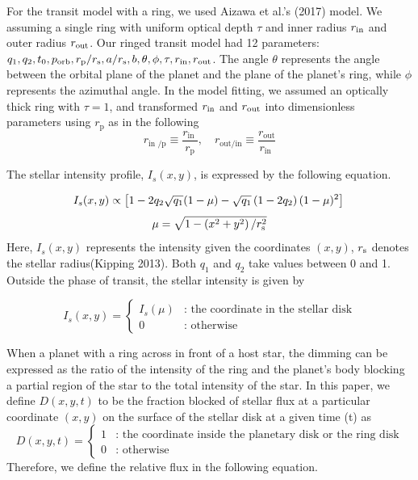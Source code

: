 \documentclass[fleqn,usenatbib, onecolumn,dvipdfmx]{mnras}
\begin{document}
For the transit model with a ring, we used Aizawa et al.'s (2017) model. We assuming a single ring with uniform optical depth $\tau$ and inner radius $r_{\rm{in}}$ and outer radius $r_{\rm{out}}$. Our ringed transit model had 12 parameters: $q_1, q_2, t_0, p_{\rm{orb}}, r_{\rm{p}}/r_{\rm{s}}, a/r_{\rm{s}}, b, \theta, \phi, \tau, r_{\rm{in}}, r_{\rm{out}}$. The angle $\theta$ represents the angle between the orbital plane of the planet and the plane of the planet's ring, while $\phi$ represents the azimuthal angle. In the model fitting, we assumed an optically thick ring with $\tau=1$, and transformed $r_{\rm{in}}$ and $r_{\rm{out}}$ into dimensionless parameters using $r_{\mathrm{p}}$ as in the following 
\begin{equation}
r_{\text {in } / \mathrm{p}} \equiv \frac{r_{\text {in }}}{r_{\mathrm{p}}}, \quad r_{\mathrm{out} / \mathrm{in}} \equiv \frac{r_{\mathrm{out}}}{r_{\text {in }}}
\end{equation}

The stellar intensity profile, $I_s(x, y)$, is expressed by the following equation.

\begin{equation} \label{eq:stellar intensity}
I_s(x, y) \propto\left[1-2 q_{2} \sqrt{q_{1}}(1-\mu)-\sqrt{q_{1}}\left(1-2 q_{2}\right)(1-\mu)^{2}\right] \\
\end{equation}
\begin{equation*}
\mu=\sqrt{1-\left(x^{2}+y^{2}\right) /r_{\rm{s}}^{2}}\\
\end{equation*}
Here, $I_s(x, y)$ represents the intensity given the coordinates $(x,y)$, $r_{\rm{s}}$ denotes the stellar radius(Kipping 2013). Both $q_{1}$ and $q_{2}$ take values between 0 and 1. Outside the phase of transit, the stellar intensity is given by

\begin{equation}  \label{eq: cases I_s(x,y)}
I_s(x,y)=
    \begin{cases}
        I_s(\mu)   &   \text{: the coordinate in the stellar disk} \\
        0   &   \text{: otherwise}
    \end{cases}
\end{equation}

When a planet with a ring across in front of a host star, the dimming can be expressed as the ratio of the intensity of the ring and the planet's body blocking a partial region of the star to the total intensity of the star. In this paper, we define $D(x,y,t)$ to be the fraction blocked of stellar flux at a particular coordinate $(x,y)$ on the surface of the stellar disk at a given time (t) as
\begin{equation}  \label{eq: cases D}
D(x,y, t)=
    \begin{cases}
        1   &   \text{: the coordinate inside the planetary disk or the ring disk} \\
        0   &   \text{: otherwise}
    \end{cases}
\end{equation}
Therefore, we define the relative flux in the following equation.
\end{document}

